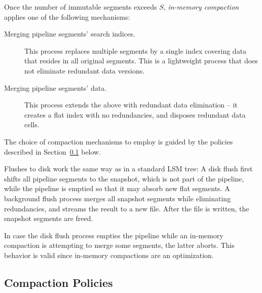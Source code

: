 Once the number of immutable segments exceeds $S$, \emph{in-memory compaction} applies one of the following mechanisms: 
\begin{description}
\item[Merging pipeline segments' search indices.]
This process replaces multiple segments by a single index covering data that resides 
in all original segments. This is a lightweight process that does not eliminate redundant 
data versions.
\item[Merging pipeline segments' data.]
This process extends the above with redundant data elimination -- it 
creates a flat index with no redundancies, and disposes redundant data cells. 
\end{description} 
The choice of compaction mechanisms to employ is guided by the policies described in Section~\ref{ssec:policies} below.

Flushes to disk work the same way as in a standard LSM tree: A disk flush first shifts all pipeline segments to the snapshot, which is not part of the pipeline, while the pipeline is emptied so that
it may absorb new flat segments. 
A background flush process merges all snapshot segments while eliminating  redundancies, and streams the result to a new file. 
After the file is written, the snapshot segments are freed. 

In case the disk flush process empties the pipeline while an in-memory compaction  is attempting to merge some segments, the latter aborts.  This behavior is valid since in-memory compactions are an optimization.

\subsection{Compaction Policies} \label{ssec:policies}

